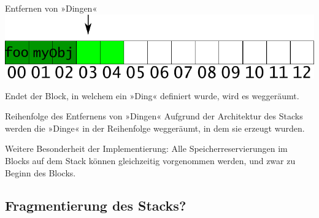 \begin{frame}[fragile, t]{Entfernen von »Dingen«}
	\includegraphics[width=\linewidth]{images/object_pop}
	
	\vspace{1em}
	
	Endet der Block, in welchem ein »Ding« definiert wurde, wird es weggeräumt.
	
	{\footnotesize
	\begin{block}{}
		
	\end{block}
	}
\end{frame}

\begin{frame}{Reihenfolge des Entfernens von »Dingen«}
	Aufgrund der Architektur des Stacks werden die »Dinge« in der Reihenfolge weggeräumt, in dem sie erzeugt wurden.
	
	\pause
	\vspace{1em}
	
	Weitere Besonderheit der Implementierung: Alle Speicherreservierungen im Blocks auf dem Stack können gleichzeitig vorgenommen werden, und zwar zu Beginn des Blocks.
\end{frame}


\subsection{Fragmentierung des Stacks?}







